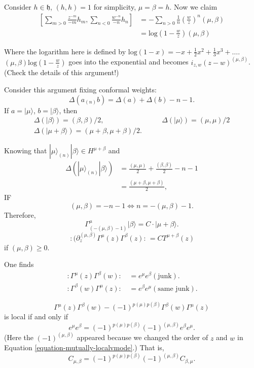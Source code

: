 \noindent
Consider $h \in \mathfrak{h}$, $(h,h)=1$ for
simplicity,
$\mu=\beta=h$. Now we claim
$$
\begin{aligned}
\left[ \sum_{m>0}\frac{z^{-m}}{-m}h_m,
\sum_{n<0}\frac{w^{-n}}{-n}h_n \right] &=
-\sum_{n>0}\frac{1}{n}\left(\frac{w}{z}
\right)^n(\mu,\beta)\\
&=\text{log}(1-\frac{w}{z})(\mu,\beta)
\end{aligned}
$$

\noindent
Where the logarithm here is defined by
$\text{log}(1-x)=-x+\frac{1}{2}x^2+\frac{1}
{3}x^3+\ldots$.
$(\mu,\beta)\text{log}(1-\frac{w}{z})$ goes
into the exponential
and becomes $i_{z,w}(z-w)^{(\mu,\beta)}$.
(Check the details of this argument!)

\medskip\noindent
Consider this argument fixing conformal
weights:
$$
\Delta(a_{(n)}b)=\Delta(a)+\Delta(b)-n-1.
$$
If $a=|\mu\rangle$, $b=|\beta\rangle$, then
$$
\begin{aligned}
\Delta(|\beta\rangle)=(\beta,\beta)/2,&\qquad
\Delta(|\mu\rangle)=(\mu,\mu)/2\\
\Delta(|\mu+\beta\rangle)=(\mu+\beta,\mu+
\beta)/2.
\end{aligned}
$$

\noindent
Knowing that
$|\mu\rangle_{(n)}|\beta\rangle\in
H^{\mu+\beta}$
and
$$
\begin{aligned}
\Delta(|\mu\rangle_{(n)}|\beta\rangle)&=
\frac{(\mu,\mu)}{2}+\frac{(\beta,\beta)}{2}-
n-1\\
&=\frac{(\mu+\beta,\mu+\beta)}{2},
\end{aligned}
$$
IF
$$
(\mu,\beta)=-n-1 \iff n=-(\mu,\beta)-1.
$$
Therefore,
$$
\Gamma^\mu_{(-(\mu,\beta)-1)}|\beta\rangle=
C\cdot|\mu+\beta\rangle.
$$
$$
\,:\!(\partial_z^{(\mu,\beta)}\Gamma^\mu(z)
\Gamma^\beta(z)\!:\,
=CT^{\mu+\beta}(z)
$$
if $(\mu,\beta)\geq 0$.

One finds
$$
\begin{aligned}
\,:\!\Gamma^\mu(z)\Gamma^\beta(w)\!:\,&=e^\mu
e^\beta(\text{junk}).\\
\,:\!\Gamma^\beta(w)\Gamma^\mu(z)\!:\,&=
e^\beta
e^\mu(\text{same junk}).
\end{aligned}
$$

\noindent
$$
\Gamma^\mu(z)\Gamma^\beta(w)-(-1)^{p(\mu)
p(\beta)}\Gamma^\beta(w)\Gamma^\mu(z)
$$
is local if and only if
$$
e^\mu
e^\beta=(-1)^{p(\mu)p(\beta)}(-1)^{(\mu,
\beta)}e^\beta
e^\mu.
$$
(Here the $(-1)^{(\mu,\beta)}$ appeared
because we changed the
order of $z$ and $w$ in Equation
\ref{equation-mutually-localvmode}.)
That is,
\begin{equation}
\label{equation-quantum-relation}
C_{\mu,\beta}=(-1)^{p(\mu)p(\beta)}(-1)
^{(\mu,\beta)}C_{\beta,\mu}.
\end{equation}


